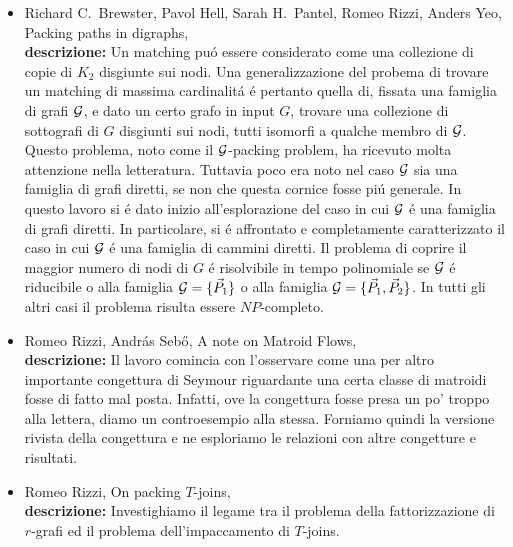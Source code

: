 \documentclass[10pt]{article}
\def\G{{\cal G}}
\def\NP{N\!P}
\begin{document}
\begin{itemize}
  \vspace{1.4mm}
  \item[] {\sc Richard C.~Brewster, Pavol Hell, Sarah H.~Pantel, Romeo Rizzi, Anders Yeo},
   \newblock  Packing paths in digraphs,
   \\
{\bf descrizione:}
Un matching pu\'o essere considerato
come una collezione di copie di $K_2$
disgiunte sui nodi.
Una generalizzazione del probema di trovare un matching
di massima cardinalit\'a \'e pertanto quella di,
fissata una famiglia di grafi $\G$,
e dato un certo grafo in input $G$,
trovare una collezione di sottografi di $G$ disgiunti sui nodi,
tutti isomorfi a qualche membro di $\G$.
Questo problema, noto come il $\G$-packing problem,
ha ricevuto molta attenzione nella letteratura.
Tuttavia poco era noto nel caso $\G$
sia una famiglia di grafi diretti,
se non che questa
cornice fosse pi\'u generale.
In questo lavoro si \'e dato inizio all'esplorazione
del caso in cui $\G$
\'e una famiglia di grafi diretti.
In particolare, si \'e affrontato
e completamente caratterizzato
il caso in cui $\G$ \'e una famiglia di cammini diretti.
Il problema di coprire il maggior numero di nodi di
$G$ \'e risolvibile in tempo
polinomiale se $\G$ \'e riducibile
o alla famiglia $\G=\{\vec{P}_1\}$
o alla famiglia $\G=\{\vec{P}_1,\vec{P}_2\}$.
In tutti gli altri casi il
problema risulta essere $\NP$-completo.\\

  \vspace{1.4mm}
  \item[] {\sc Romeo Rizzi, Andr\'{a}s Seb\H{o}},
   \newblock A note on Matroid Flows,
   \\
{\bf descrizione:}
Il lavoro comincia con l'osservare
come una per altro importante
congettura di Seymour riguardante
una certa classe di matroidi
fosse di fatto mal posta.
Infatti,
ove la congettura fosse presa un po' troppo alla lettera,
diamo un controesempio alla stessa.
Forniamo quindi la versione rivista della congettura
e ne esploriamo le relazioni con altre
congetture e risultati.\\

  \vspace{1.4mm}
  \item[] {\sc Romeo Rizzi},
   \newblock  On packing $T$-joins,
   \\
{\bf descrizione:}
Investighiamo il legame tra
il problema della fattorizzazione di $r$-grafi
ed il problema dell'impaccamento di $T$-joins.
\end{itemize}
\end{document}
